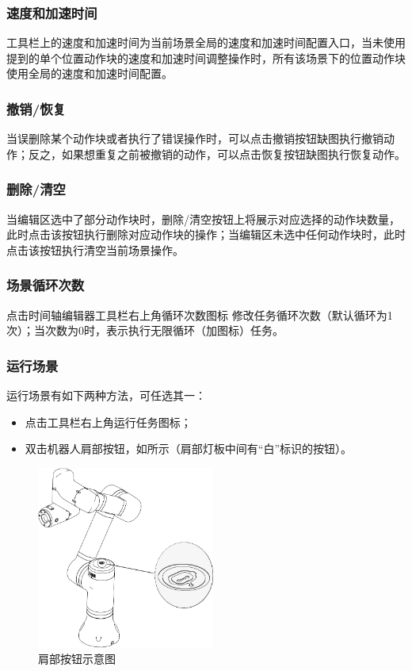 \subsubsection{速度和加速时间}
\label{sec:速度和加速时间}
工具栏上的速度和加速时间为当前场景全局的速度和加速时间配置入口，当未使用提到的单个位置动作块的速度和加速时间调整操作时，所有该场景下的位置动作块使用全局的速度和加速时间配置。
\subsubsection{撤销/恢复}
当误删除某个动作块或者执行了错误操作时，可以点击撤销按钮{\color{red}缺图}执行撤销动作；反之，如果想重复之前被撤销的动作，可以点击恢复按钮{\color{red}缺图}执行恢复动作。

\subsubsection{删除/清空}
当编辑区选中了部分动作块时，删除/清空按钮上将展示对应选择的动作块数量，此时点击该按钮执行删除对应动作块的操作；当编辑区未选中任何动作块时，此时点击该按钮执行清空当前场景操作。

\subsubsection{场景循环次数}
点击时间轴编辑器工具栏右上角循环次数图标 修改任务循环次数（默认循环为1次）；当次数为0时，表示执行无限循环（加图标）任务。
\subsubsection{运行场景}
\label{sec:运行场景}
运行场景有如下两种方法，可任选其一：
\begin{itemize}
	\item 点击工具栏右上角运行任务图标；
	\item 双击机器人肩部按钮，如所示（肩部灯板中间有“白”标识的按钮）。
\end{itemize}

\begin{figure}[ht]
	\centering
	\includegraphics[height=6cm]{line_graphs/shoulder_btn.pdf}
	\caption{肩部按钮示意图}
	\label{fig:肩部按钮示意图}
\end{figure}

